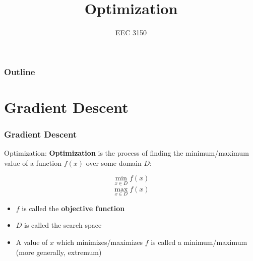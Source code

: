 \documentclass{beamer}
\title{Optimization}
\author{EEC 3150}
\date{}
\institute{Trevecca Nazarene University}
\begin{document}
\frame{\titlepage}
 
\begin{frame}	
	\frametitle{Outline}
	\tableofcontents	
\end{frame}


\section{Gradient Descent}

\begin{frame}	
\end{frame}

\begin{frame}	
	\frametitle{Gradient Descent}
	
	\begin{alertblock}{Optimization:}
		\textbf{Optimization} is the process of finding the minimum/maximum value of a function $f(x)$ over some domain $D$:
		
		\vspace{5pt}
			\begin{equation*}
				\min_{x \in D} f(x)
			\end{equation*}
		\endminipage\hfill
			\begin{equation*}
				\max_{x \in D} f(x)
			\end{equation*}			
		\endminipage\hfill
		
		\vspace{10pt}
		\begin{itemize}
			\item $f$ is called the \textbf{objective function}
			\item $D$ is called the search space
			\item A value of $x$ which minimizes/maximizes $f$ is called a minimum/maximum (more generally, extremum)
		\end{itemize}
	\end{alertblock}
\end{frame}
\end{document}
